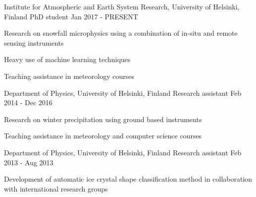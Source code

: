 

\begin{cventries}

  \cventry
    {Institute for Atmospheric and Earth System Research, University of Helsinki, Finland} %
    {PhD student} %
    {} %
    {Jan 2017 - PRESENT} %
    {
      \begin{cvitems} %
        \item {Research on snowfall microphysics using a combination of in-situ and remote sensing instruments}
        \item {Heavy use of machine learning techniques}
        \item {Teaching assistance in meteorology courses}
      \end{cvitems}
    }

  \cventry
    {Department of Physics, University of Helsinki, Finland} %
    {Research assistant} %
    {} %
    {Feb 2014 - Dec 2016} %
    {
      \begin{cvitems} %
        \item {Research on winter precipitation using ground based instruments}
        \item {Teaching assistance in meteorology and computer science courses}
      \end{cvitems}
    }

  \cventry
    {Department of Physics, University of Helsinki, Finland} %
    {Research assistant} %
    {} %
    {Feb 2013 - Aug 2013} %
    {
      \begin{cvitems} %
        \item {Development of automatic ice crystal shape classification method in collaboration with international research groups}
      \end{cvitems}
    }


\end{cventries}
